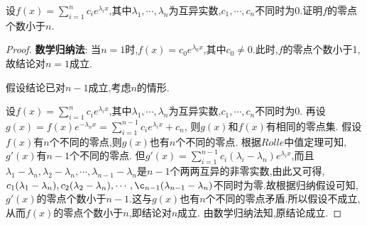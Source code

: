 \documentclass[lang=cn,newtx,10pt,scheme=chinese]{elegantbook}
\begin{document}
\begin{exercise}
    设\(f(x)=\sum_{i = 1}^{n}c_{i}e^{\lambda_{i}x}\),其中\(\lambda_1,\cdots,\lambda_n\)为互异实数,\(c_1,\cdots,c_n\)不同时为\(0\).证明\(f\)的零点个数小于\(n\).
    \end{exercise}
\begin{proof}
        \textbf{数学归纳法}:
        当$n=1$时,$f(x)=c_0e^{\lambda_0 x}$,其中$c_0\ne0$.此时,$f$的零点个数小于1,故结论对$n=1$成立.

        假设结论已对$n-1$成立,考虑$n$的情形.
        
        设$f(x)=\sum_{i=1}^{n} c_ie^{\lambda_ix}$,其中\(\lambda_1,\cdots,\lambda_n\)为互异实数,\(c_1,\cdots,c_n\)不同时为\(0\).
        再设$g(x)=f(x)e^{-\lambda_nx}=\sum_{i=1}^{n-1} c_ie^{\lambda_ix}+c_n$,
        则$g(x)$和$f(x)$有相同的零点集.
        假设$f(x)$有$n$个不同的零点,则$g(x)$也有$n$个不同的零点.
        根据$Rolle$中值定理可知,$g'(x)$有$n-1$个不同的零点.
        但$g'(x)=\sum_{i=1}^{n-1} c_i(\lambda_i-\lambda_n)e^{\lambda_ix}$,而且$\lambda_1-\lambda_n,\lambda_2-\lambda_n,\cdots,\lambda_{n-1}-\lambda_n$是$n-1$个两两互异的非零实数,由此又可得,$c_1(\lambda_1-\lambda_n),c_2(\lambda_2-\lambda_n),\cdots,\c_{n-1}(\lambda_{n-1}-\lambda_n)$不同时为零.故根据归纳假设可知,$g'(x)$的零点个数小于$n-1$.这与$g(x)$也有$n$个不同的零点矛盾.所以假设不成立,从而$f(x)$的零点个数小于$n$,即结论对$n$成立.
        由数学归纳法知,原结论成立.
\end{proof}
\end{document}
